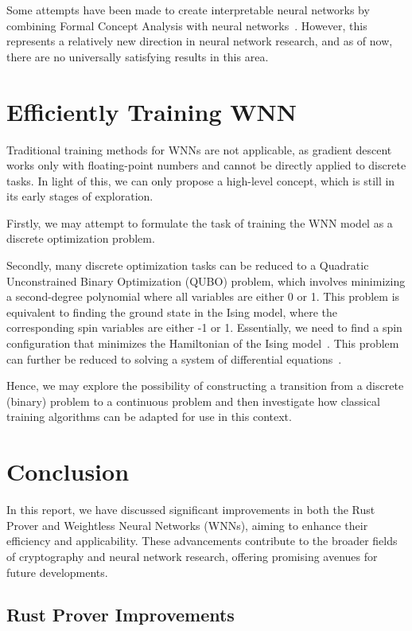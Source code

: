 \documentclass{article}[12pt]
\begin{document}
Some attempts have been made to create interpretable neural networks by combining Formal Concept Analysis with neural networks~\cite{parakal2022intrinsically, dudyrev2022human, kuznetsov2022pattern}.
However, this represents a relatively new direction in neural network research, and as of now, there are no universally satisfying results in this area.

\section{Efficiently Training WNN}\label{sec:training-wnn}
Traditional training methods for WNNs are not applicable, as gradient descent works only with floating-point numbers and cannot be directly applied to discrete tasks.
In light of this, we can only propose a high-level concept, which is still in its early stages of exploration.

Firstly, we may attempt to formulate the task of training the WNN model as a discrete optimization problem.

Secondly, many discrete optimization tasks can be reduced to a Quadratic Unconstrained Binary Optimization (QUBO) problem, which involves minimizing a second-degree polynomial where all variables are either 0 or 1.
This problem is equivalent to finding the ground state in the Ising model, where the corresponding spin variables are either -1 or 1.
Essentially, we need to find a spin configuration that minimizes the Hamiltonian of the Ising model~\cite{glover2018logical}.
This problem can further be reduced to solving a system of differential equations~\cite{goto2019combinatorial, goto2021high}.

Hence, we may explore the possibility of constructing a transition from a discrete (binary) problem to a continuous problem and then investigate how classical training algorithms can be adapted for use in this context.

\section{Conclusion}\label{sec:conclusion}

In this report, we have discussed significant improvements in both the Rust Prover and Weightless Neural Networks (WNNs), aiming to enhance their efficiency and applicability.
These advancements contribute to the broader fields of cryptography and neural network research, offering promising avenues for future developments.

\subsection{Rust Prover Improvements}\label{subsec:prover-conclusion}
\end{document}
